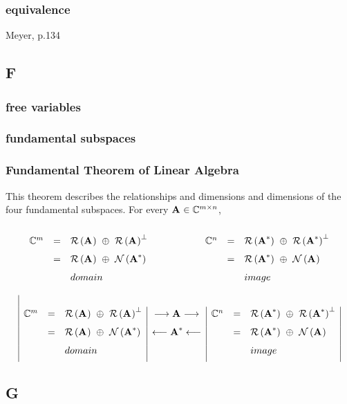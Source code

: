 \subsubsection*{equivalence}
Meyer, p.134

\subsection*{F} 

\subsubsection*{free variables}

\subsubsection*{fundamental subspaces}

\subsubsection*{Fundamental Theorem of Linear Algebra}
This theorem describes the relationships and dimensions and dimensions of the four fundamental subspaces.
For every $ \A{} \in \cmplx{ m \times n } $,
$$
\begin{array}{ lclclcl }
\\
  \cmplx{ m } & = & \rng{\A{}} \ \oplus \  \rng{\A{}}^{ \perp } & \qquad \qquad & \cmplx{ n } & = & \rng{\A{*}} \ \oplus \  \rng{\A{*}}^{ \perp } \\[7pt]
  & = & \rng{\A{}} \ \oplus \  \nll{\A{*}} & \qquad \qquad & & = & \rng{\A{*}} \ \oplus \  \nll{\A{}} \\[7pt]
  & &  domain & & & &  image \\[5pt]
\end{array}
$$
$$
\begin{array}{ |lcl|c|lcl| }
\\
  \cmplx{ m } & = & \rng{\A{}} \ \oplus \  \rng{\A{}}^{ \perp } & \longrightarrow \A{} \longrightarrow & \cmplx{ n } & = & \rng{\A{*}} \ \oplus \  \rng{\A{*}}^{ \perp } \\[7pt]
  & = & \rng{\A{}} \ \oplus \  \nll{\A{*}} & \longleftarrow \A{*} \longleftarrow & & = & \rng{\A{*}} \ \oplus \  \nll{\A{}} \\[7pt]
  & &  domain & & & &  image \\[5pt]
\end{array}
$$

\subsection*{G} 

